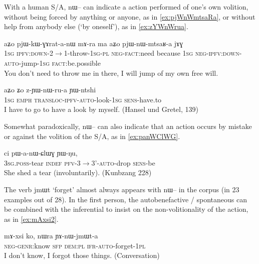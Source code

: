 \documentclass[oldfontcommands,oneside,a4paper,11pt]{article}
\newcommand{\ipa}[1]{{\phon \mbox{#1}}} %
\begin{document}
With a human S/A, \ipa{nɯ--} can indicate a action performed of one's own volition, without being forced by anything or anyone, as in \ref{ex:pjWnWmtsaRa}, or without help from anybody else (`by oneself'), as in \ref{ex:zYWnWrua}.

\begin{exe}
\ex \label{ex:pjWnWmtsaRa}
\gll 
\ipa{aʑo} 	\ipa{pjɯ-kɯ-ɣɤrat-a-nɯ} 	\ipa{mɤ-ra} 	\ipa{ma} 	\ipa{aʑo} 	\ipa{pjɯ-nɯ-mtsaʁ-a} 	\ipa{jɤɣ} \\
\textsc{1sg} \textsc{ipfv:down}-2$\rightarrow$1-throw-\textsc{1sg-pl} \textsc{neg-fact}:need because \textsc{1sg} \textsc{neg-ipfv:down-auto}-jump-\textsc{1sg} \textsc{fact}:be.possible \\
\glt You don't need to throw me in there, I will jump of my own free will.
\end{exe}



\begin{exe}
\ex \label{ex:zYWnWrua}
\gll
\ipa{aʑo} 	\ipa{ʑo} 	\ipa{z-ɲɯ-nɯ-ru-a} 	\ipa{ɲɯ-ntshi} \\
\textsc{1sg} \textsc{emph} \textsc{transloc-ipfv-auto}-look-\textsc{1sg} \textsc{sens}-have.to \\
\glt I have to go to have a look by myself. (Hansel und Gretel, 139)
\end{exe} 



Somewhat paradoxically, \ipa{nɯ--} can also indicate that an action occurs by mistake or against the volition of the S/A, as in \ref{ex:panWClWG}.

\begin{exe}
\ex \label{ex:panWClWG}
\gll \ipa{ɯ-qom} 	\ipa{ci} 	\ipa{pɯ-a-nɯ-ɕlɯɣ} 	\ipa{ɲɯ-ŋu,} \\
\textsc{3sg.poss}-tear \textsc{indef} \textsc{pfv-3$\rightarrow$3'-auto}-drop \textsc{sens}-be \\
\glt She shed a tear (involuntarily). (Kunbzang 228)
\end{exe}

The verb \ipa{jmɯt} `forget' almost always appears with \ipa{nɯ--} in the corpus (in 23 examples out of 28). In the first person, the autobenefactive / spontaneous can be combined with the inferential to insist on the non-volitionality of the action, as in  \ref{ex:mAxsi2}.

\begin{exe}
 \ex \label{ex:mAxsi2}
 \gll
\ipa{mɤ-xsi}  	\ipa{ko,}  	\ipa{nɯra}  	\ipa{ɲɤ-nɯ-jmɯt-a}  \\
\textsc{neg-genr}:know \textsc{sfp} \textsc{dem:pl} \textsc{ifr-auto}-forget-\textsc{1pl} \\
\glt I don't know, I forgot those things. (Conversation)
\end{exe}
\end{document}
